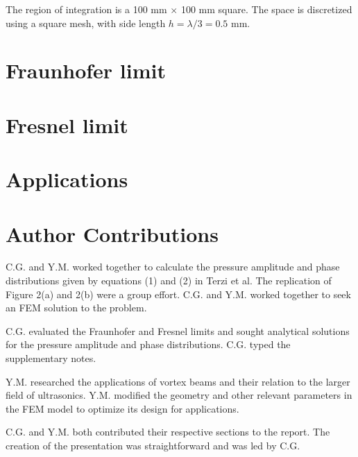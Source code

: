 \documentclass[12pt]{article}%
\begin{document}
The region of integration is a 100 mm $\times$ 100 mm square. The space is discretized using a square mesh, with side length $h = \lambda/3 = 0.5$ mm. 

\section{Fraunhofer limit}\label{Fraunhofer limit}

\section{Fresnel limit}\label{Fresnel limit}



\section{Applications}\label{Applications}



\section*{Author Contributions} %

C.G. and Y.M. worked together to calculate the pressure amplitude and phase distributions given by equations (1) and (2) in Terzi et al. The replication of Figure 2(a) and 2(b) were a group effort. C.G. and Y.M. worked together to seek an FEM solution to the problem.

C.G. evaluated the Fraunhofer and Fresnel limits and sought analytical solutions for the pressure amplitude and phase distributions. C.G. typed the supplementary notes.

Y.M. researched the applications of vortex beams and their relation to the larger field of ultrasonics. Y.M. modified the geometry and other relevant parameters in the FEM model to optimize its design for applications.

C.G. and Y.M. both contributed their respective sections to the report. The creation of the presentation was straightforward and was led by C.G.
\end{document}
